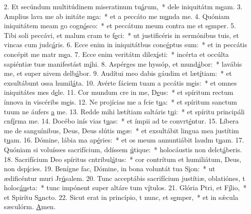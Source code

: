 2. Et secúndum multitúdinem miseratinum tu\uline{á}rum,~* dele iniquitátm m\uline{e}am.
3. Amplius lava me ab initáte m\uline{e}a:~* et a peccáto me m\uline{u}nda me.
4. Quóniam iniquitátem meam go cogn\uline{ó}sco:~* et peccátum meum contra me st s\uline{e}mper.
5. Tibi soli peccávi, et malum cram te f\uline{e}ci:~* ut justificéris in sermónibus tuis, et vincas cum judc\uline{á}ris.
6. Ecce enim in iniquitátbus conc\uline{é}ptus sum:~* et in peccátis concépit me matr m\uline{e}a.
7. Ecce enim veritátm dilex\uline{í}sti:~* incérta et occúlta sapiéntiæ tuæ manifestást m\uline{i}hi.
8. Aspérges me hyssóp, et mund\uline{á}bor:~* lavábis me, et super nivem delb\uline{á}bor.
9. Audítui meo dabis gáudim et læt\uline{í}tiam:~* et exsultábunt ossa humil\uline{á}ta.
10. Avérte fáciem tuam a pccátis m\uline{e}is:~* et omnes iniquitátes mes d\uline{e}le.
11. Cor mundum cre in me, D\uline{e}us:~* et spíritum rectum ínnova in viscéribs m\uline{e}is.
12. Ne projícias me a fcie t\uline{u}a:~* et spíritum sanctum tuum ne áufers \uline{a} me.
13. Redde mihi lætítiam saltáris t\uline{u}i:~* et spíritu principáli cnf\uline{í}rma me.
14. Docébo inís vias t\uline{u}as:~* et ímpii ad te convrt\uline{é}ntur.
15. Líbera me de sanguínibus, Deus, Deus slútis m\uline{e}æ:~* et exsultábit lingua mea justítim t\uline{u}am.
16. Dómine, lábia ma ap\uline{é}ries:~* et os meum annuntiábit laudm t\uline{u}am.
17. Quóniam si voluísses sacrifícium, ddíssem \uline{ú}tique:~* holocáustis non delct\uline{á}beris.
18. Sacrifícium Deo spíritus cntribul\uline{á}tus:~* cor contrítum et humiliátum, Deus, non dsp\uline{í}cies.
19. Benígne fac, Dómine, in bona voluntát tua S\uline{i}on:~* ut ædificéntur muri Jr\uline{ú}salem.
20. Tunc acceptábis sacrifícium justítiæ, oblatiónes, t holoc\uline{áu}sta:~* tunc impónent super altáre tum v\uline{í}tulos.
21. Glória Ptri, et F\uline{í}lio,~* et Spirítu S\uline{a}ncto.
22. Sicut erat in princípio, t nunc, et s\uline{e}mper,~* et in sǽcula sæculórm. \uline{A}men.
